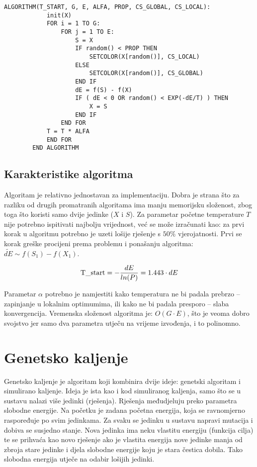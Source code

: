 \documentclass[times, utf8, diplomski, numeric]{fer}
\begin{document}
\begin{singlespace}
	\begin{lstlisting}[caption=Pseudok\^{o}d simuliranog kaljenja]
		ALGORITHM(T_START, G, E, ALFA, PROP, CS_GLOBAL, CS_LOCAL):
			init(X)
			FOR i = 1 TO G:
				FOR j = 1 TO E:
					S = X
					IF random() < PROP THEN
						SETCOLOR(X[random()], CS_LOCAL)
					ELSE
						SETCOLOR(X[random()], CS_GLOBAL)
					END IF
					dE = f(S) - f(X)
					IF ( dE < 0 OR random() < EXP(-dE/T) ) THEN
						X = S
					END IF
				END FOR
			T = T * ALFA
			END FOR
		END ALGORITHM
	\end{lstlisting}
\end{singlespace}

\subsection{Karakteristike algoritma}

Algoritam je relativno jednostavan za implementaciju. Dobra je strana što za razliku od drugih promatranih algoritama ima manju memorijsku složenost, zbog toga što koristi samo dvije jedinke ($X$ i $S$). Za parametar početne temperature $T$ nije potrebno ispitivati najbolju vrijednost, već se može izračunati kao: za prvi korak u algoritmu potrebno je uzeti lošije rješenje s $50\%$ vjerojatnosti. Prvi se korak greške procijeni prema problemu i ponašanju algoritma: $\tilde{dE}\sim f(S_1)-f(X_1)$.  

\begin{equation}
\textup{T\_start} = -\frac{dE}{ln(P)} = 1.443 \cdot dE
\end{equation}  

Parametar $\alpha$ potrebno je namjestiti kako temperatura ne bi padala prebrzo -- zapinjanje u lokalnim optimumima, ili kako ne bi padala presporo -- slaba konvergencija. Vremenska složenost algoritma je: $O(G\cdot E)$, što je veoma dobro svojstvo jer samo dva parametra utječu na vrijeme izvođenja, i to polinomno. 

\section{Genetsko kaljenje}

Genetsko kaljenje \cite{lit18} je algoritam koji kombinira dvije ideje: genetski algoritam i simulirano kaljenje. Ideja je ista kao i kod simuliranog kaljenja, samo što se u sustavu nalazi više jedinki (rješenja). Rješenja međudjeluju preko parametra slobodne energije. Na početku je zadana početna energija, koja se ravnomjerno raspoređuje po svim jedinkama. Za svaku se jedinku u sustavu napravi mutacija i dobiva se susjedno stanje. Nova jedinka ima neku vlastitu energiju (funkcija cilja) te se prihvaća kao novo rješenje ako je vlastita energija nove jedinke manja od zbroja stare jedinke i djela slobodne energije koju je stara čestica dobila. Tako slobodna energija utječe na odabir lošijih jedinki.
\end{document}
